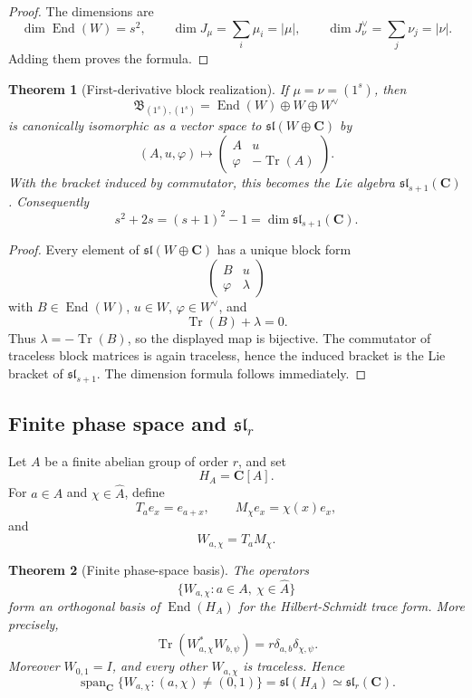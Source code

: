 \documentclass[11pt]{article}
\newcommand{\C}{\mathbf C}
\newcommand{\Tr}{\operatorname{Tr}}
\newcommand{\End}{\operatorname{End}}
\newcommand{\Span}{\operatorname{span}}
\theoremstyle{plain}
\newtheorem{theorem}{Theorem}[section]
\theoremstyle{definition}
\begin{document}
\begin{proof}
The dimensions are
\[
   \dim\End(W)=s^2,
   \qquad
   \dim J_\mu=\sum_i\mu_i=|\mu|,
   \qquad
   \dim J_\nu^\vee=\sum_j\nu_j=|\nu|.
\]
Adding them proves the formula.
\end{proof}

\begin{theorem}[First-derivative block realization]\label{thm:first-derivative-sl}
If \(\mu=\nu=(1^s)\), then
\[
   \mathfrak B_{(1^s),(1^s)}=\End(W)\oplus W\oplus W^\vee
\]
is canonically isomorphic as a vector space to \(\mathfrak{sl}(W\oplus\C)\) by
\[
   (A,u,\varphi)
   \longmapsto
   \begin{pmatrix}
   A & u\\
   \varphi & -\Tr(A)
   \end{pmatrix}.
\]
With the bracket induced by commutator, this becomes the Lie algebra \(\mathfrak{sl}_{s+1}(\C)\).  Consequently
\[
   s^2+2s=(s+1)^2-1=\dim \mathfrak{sl}_{s+1}(\C).
\]
\end{theorem}

\begin{proof}
Every element of \(\mathfrak{sl}(W\oplus\C)\) has a unique block form
\[
   \begin{pmatrix}
   B & u\\
   \varphi & \lambda
   \end{pmatrix}
\]
with \(B\in\End(W)\), \(u\in W\), \(\varphi\in W^\vee\), and
\[
   \Tr(B)+\lambda=0.
\]
Thus \(\lambda=-\Tr(B)\), so the displayed map is bijective.  The commutator of traceless block matrices is again traceless, hence the induced bracket is the Lie bracket of \(\mathfrak{sl}_{s+1}\).  The dimension formula follows immediately.
\end{proof}

\subsection{Finite phase space and \texorpdfstring{\(\mathfrak{sl}_r\)}{slr}}

Let \(A\) be a finite abelian group of order \(r\), and set
\[
   H_A=\C[A].
\]
For \(a\in A\) and \(\chi\in\widehat A\), define
\[
   T_ae_x=e_{a+x},
   \qquad
   M_\chi e_x=\chi(x)e_x,
\]
and
\[
   W_{a,\chi}=T_aM_\chi.
\]

\begin{theorem}[Finite phase-space basis]\label{thm:phase-basis}
The operators
\[
   \{W_{a,\chi}:a\in A,\ \chi\in\widehat A\}
\]
form an orthogonal basis of \(\End(H_A)\) for the Hilbert-Schmidt trace form.  More precisely,
\[
   \Tr(W_{a,\chi}^*W_{b,\psi})=r\delta_{a,b}\delta_{\chi,\psi}.
\]
Moreover \(W_{0,1}=I\), and every other \(W_{a,\chi}\) is traceless.  Hence
\[
   \Span_\C\{W_{a,\chi}:(a,\chi)\ne(0,1)
\}=\mathfrak{sl}(H_A)\simeq\mathfrak{sl}_r(\C).
\]
\end{theorem}
\end{document}
